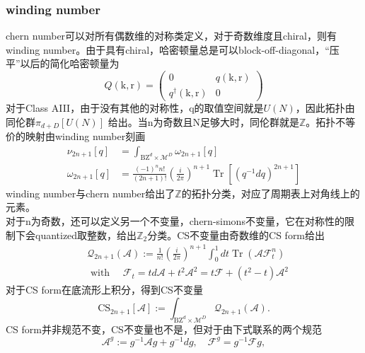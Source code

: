 \documentclass[10pt,openany]{book}
\theoremstyle{thmstyle} %
\theoremstyle{defstyle} %
\theoremstyle{prostyle} %
\begin{document}
\subsubsection*{winding number}
chern number可以对所有偶数维的对称类定义，对于奇数维度且chiral，则有winding number。由于具有chiral，哈密顿量总是可以block-off-diagonal，“压平”以后的简化哈密顿量为
\begin{equation}
  Q(\mathrm{k}, \mathrm{r})=\left(\begin{array}{cc}
    0 & q(\mathrm{k}, \mathrm{r}) \\
    q^{\dagger}(\mathrm{k}, \mathrm{r}) & 0
    \end{array}\right)
\end{equation}
对于Class AIII，由于没有其他的对称性，q的取值空间就是$ U(N) $，因此拓扑由同伦群$ \pi_{d+D}[U(N)] $ 给出。当n为奇数且N足够大时，同伦群就是$ \mathbb{Z} $。拓扑不等价的映射由winding number刻画
\begin{equation}
  \begin{aligned}
    \nu_{2 n+1}[q] & =\int_{\mathrm{BZ}^d \times \mathcal{M}^D} \omega_{2 n+1}[q] \\
    \omega_{2 n+1}[q] & =\frac{(-1)^n n!}{(2 n+1)!}\left(\frac{i}{2 \pi}\right)^{n+1} \operatorname{Tr}\left[\left(q^{-1} d q\right)^{2 n+1}\right]
    \end{aligned}
\end{equation} 
winding number与chern number给出了$ \mathbb{Z} $的拓扑分类，对应了周期表上对角线上的元素。\\
对于n为奇数，还可以定义另一个不变量，chern-simons不变量，它在对称性的限制下会quantized取整数，给出$ \mathbb{Z}_2 $分类。CS不变量由奇数维的CS form给出
\begin{equation}
  \begin{aligned}
    & \mathcal{Q}_{2 n+1}(\mathcal{A}):=\frac{1}{n!}\left(\frac{i}{2 \pi}\right)^{n+1} \int_0^1 d t \operatorname{Tr}\left(\mathcal{A} \mathcal{F}_t^n\right) \\
    & \text { with } \quad \mathcal{F}_t=t d \mathcal{A}+t^2 \mathcal{A}^2=t \mathcal{F}+\left(t^2-t\right) \mathcal{A}^2
    \end{aligned}
\end{equation}
对于CS form在底流形上积分，得到CS不变量
\begin{equation}
  \mathrm{CS}_{2 n+1}[\mathcal{A}]:=\int_{\mathrm{BZ}^d \times \mathcal{M}^D} \mathcal{Q}_{2 n+1}(\mathcal{A}) .
\end{equation}
CS form并非规范不变，CS不变量也不是，但对于由下式联系的两个规范
\begin{equation}
  \mathcal{A}^g:=g^{-1} \mathcal{A} g+g^{-1} d g, \quad \mathcal{F}^g=g^{-1} \mathcal{F} g,
\end{equation}
\end{document}
